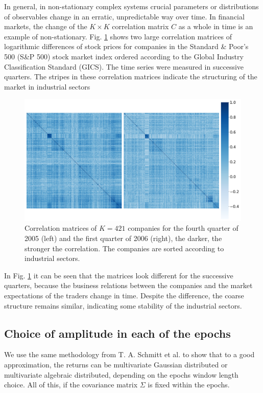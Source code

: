 In general, in non-stationary complex systems crucial parameters or
distributions of observables change in an erratic, unpredictable way over time.
In financial markets, the change of the $K \times K$ correlation matrix $C$ as
a whole in time is an example of non-stationary. Fig.
\ref{fig:correlation_matrices} shows two large correlation matrices of
logarithmic differences of stock prices for companies in the Standard \&
Poor's 500 (S\&P 500) stock market index ordered according to the Global
Industry Classification Standard (GICS). The time series were measured in
successive quarters. The stripes in these correlation matrices indicate the
structuring of the market in industrial sectors
\cite{state_crisis_7,non_stationarity_fin_guhr}

\begin{figure}[htbp]
    \centering
    \includegraphics[width=0.6\columnwidth]
    {figures/05_correlation_matrix.png}
    \caption{Correlation matrices of $K = 421$ companies for the fourth quarter
             of 2005 (left) and the first quarter of 2006 (right), the darker,
             the stronger the correlation. The companies are sorted according
             to industrial sectors.}
    \label{fig:correlation_matrices}
\end{figure}

In Fig. \ref{fig:correlation_matrices} it can be seen that the matrices look
different for the successive quarters, because the business relations between
the companies and the market expectations of the traders change in time.
Despite the difference, the coarse structure remains similar, indicating some
stability of the industrial sectors.

\subsection{Choice of amplitude in each of the epochs}\label{subsec:epochs}

We use the same methodology from T. A. Schmitt et al.
\cite{non_stationarity_fin_guhr} to show that to a good approximation, the
returns can be multivariate Gaussian distributed or multivariate algebraic
distributed, depending on the epochs window length choice. All of this, if the
covariance matrix $\Sigma$ is fixed within the epochs.

